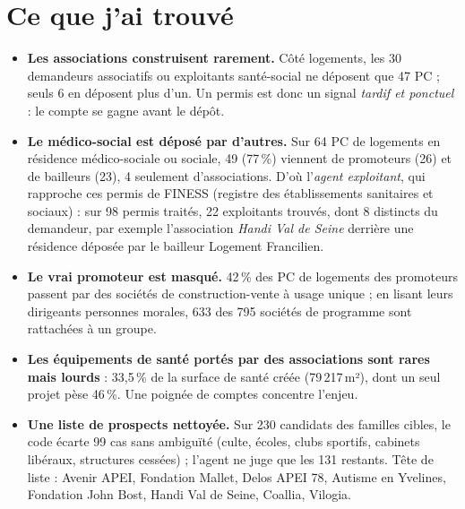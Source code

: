 \documentclass[10pt,a4paper]{article}
\begin{document}
\section{Ce que j'ai trouvé}
\begin{itemize}
\item \textbf{Les associations construisent rarement.} Côté logements, les 30 demandeurs associatifs ou exploitants santé-social ne déposent que
  47 PC ; seuls 6 en déposent plus d'un. Un permis est donc un signal \emph{tardif et ponctuel} : le compte se gagne avant le dépôt.
\item \textbf{Le médico-social est déposé par d'autres.} Sur 64 PC de logements en résidence médico-sociale ou sociale, 49 (77\,\%) viennent de
  promoteurs (26) et de bailleurs (23), 4 seulement d'associations. D'où l'\emph{agent exploitant}, qui rapproche ces permis de
  FINESS (registre des établissements sanitaires et sociaux) : sur 98 permis traités, 22 exploitants trouvés, dont 8 distincts du
  demandeur, par exemple l'association \emph{Handi Val de Seine} derrière une résidence déposée par le bailleur Logement Francilien.
\item \textbf{Le vrai promoteur est masqué.} 42\,\% des PC de logements des promoteurs passent par des sociétés de construction-vente à usage unique ;
  en lisant leurs dirigeants personnes morales, 633 des 795 sociétés de programme sont rattachées à un groupe.
\item \textbf{Les équipements de santé portés par des associations sont rares mais lourds} : 33,5\,\% de la surface de santé créée
  (79\,217\,m²), dont un seul projet pèse 46\,\%. Une poignée de comptes concentre l'enjeu.
\item \textbf{Une liste de prospects nettoyée.} Sur 230 candidats des familles cibles, le code écarte 99 cas sans ambiguïté
  (culte, écoles, clubs sportifs, cabinets libéraux, structures cessées) ; l'agent ne juge que les 131 restants. Tête de liste :
  Avenir APEI, Fondation Mallet, Delos APEI 78, Autisme en Yvelines, Fondation John Bost, Handi Val de Seine, Coallia, Vilogia.
\end{itemize}

\clearpage
\end{document}

